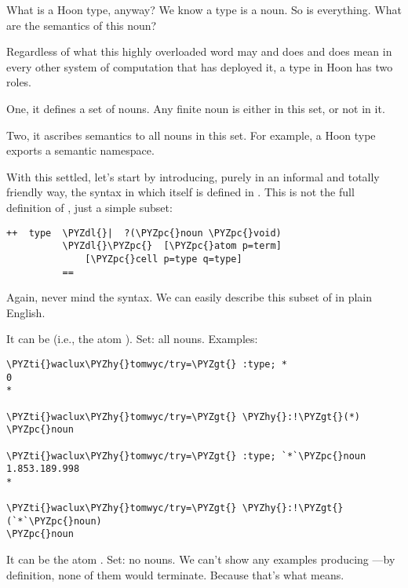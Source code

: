What is a Hoon type, anyway?  We know a type is a noun.  So is
everything.  What are the semantics of this noun?

Regardless of what this highly overloaded word may and does and
does mean in every other system of computation that has deployed
it, a type in Hoon has two roles.

One, it defines a set of nouns.  Any finite noun is either in
this set, or not in it.

Two, it ascribes semantics to all nouns in this set.  For
example, a Hoon type exports a semantic namespace.

With this settled, let's start by introducing, purely in an
informal and totally friendly way, the  syntax in which
 itself is defined in .  This is
not the full definition of , just a simple subset:

\begin{framed_shaded}
\begin{Verbatim}[fontsize=\relsize{-2.5},fontseries=b,commandchars=\\\{\}]
++  type  \PYZdl{}|  ?(\PYZpc{}noun \PYZpc{}void)
          \PYZdl{}\PYZpc{}  [\PYZpc{}atom p=term]
              [\PYZpc{}cell p=type q=type]
          ==
\end{Verbatim}
\end{framed_shaded}

Again, never mind the syntax.  We can easily describe this subset
of  in plain English.

It can be  (i.e., the atom ).  Set:
all nouns.  Examples:

\begin{framed_shaded}
\begin{Verbatim}[fontsize=\relsize{-2.5},fontseries=b,commandchars=\\\{\}]
\PYZti{}waclux\PYZhy{}tomwyc/try=\PYZgt{} :type; *
0
*

\PYZti{}waclux\PYZhy{}tomwyc/try=\PYZgt{} \PYZhy{}:!\PYZgt{}(*)
\PYZpc{}noun

\PYZti{}waclux\PYZhy{}tomwyc/try=\PYZgt{} :type; `*`\PYZpc{}noun
1.853.189.998
*

\PYZti{}waclux\PYZhy{}tomwyc/try=\PYZgt{} \PYZhy{}:!\PYZgt{}(`*`\PYZpc{}noun)
\PYZpc{}noun
\end{Verbatim}
\end{framed_shaded}

It can be the atom .  Set: no nouns.  We can't show any
examples producing ---by definition, none of them would
terminate.  Because that's what  means.

